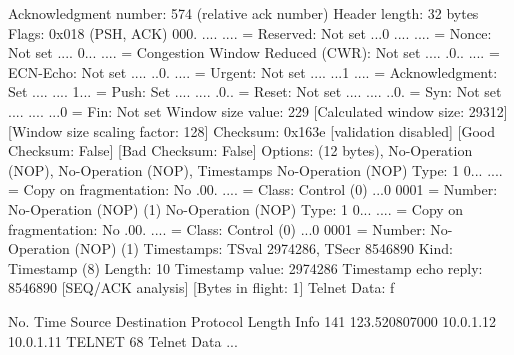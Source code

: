     Acknowledgment number: 574    (relative ack number)
    Header length: 32 bytes
    Flags: 0x018 (PSH, ACK)
        000. .... .... = Reserved: Not set
        ...0 .... .... = Nonce: Not set
        .... 0... .... = Congestion Window Reduced (CWR): Not set
        .... .0.. .... = ECN-Echo: Not set
        .... ..0. .... = Urgent: Not set
        .... ...1 .... = Acknowledgment: Set
        .... .... 1... = Push: Set
        .... .... .0.. = Reset: Not set
        .... .... ..0. = Syn: Not set
        .... .... ...0 = Fin: Not set
    Window size value: 229
    [Calculated window size: 29312]
    [Window size scaling factor: 128]
    Checksum: 0x163e [validation disabled]
        [Good Checksum: False]
        [Bad Checksum: False]
    Options: (12 bytes), No-Operation (NOP), No-Operation (NOP), Timestamps
        No-Operation (NOP)
            Type: 1
                0... .... = Copy on fragmentation: No
                .00. .... = Class: Control (0)
                ...0 0001 = Number: No-Operation (NOP) (1)
        No-Operation (NOP)
            Type: 1
                0... .... = Copy on fragmentation: No
                .00. .... = Class: Control (0)
                ...0 0001 = Number: No-Operation (NOP) (1)
        Timestamps: TSval 2974286, TSecr 8546890
            Kind: Timestamp (8)
            Length: 10
            Timestamp value: 2974286
            Timestamp echo reply: 8546890
    [SEQ/ACK analysis]
        [Bytes in flight: 1]
Telnet
    Data: f

No.     Time           Source                Destination           Protocol Length Info
    141 123.520807000  10.0.1.12             10.0.1.11             TELNET   68     Telnet Data ...

